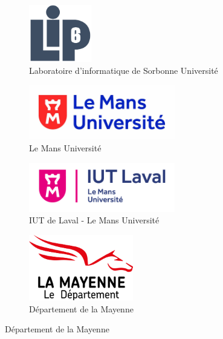 \begin{figure}[!ht]
	\begin{subfigure}{0.4\textwidth}
            \centering
		\includegraphics[width=0.3\textwidth]{Content/figures/logo_LIP6.png}
		\caption{Laboratoire d'informatique de Sorbonne Université}
	\end{subfigure}
	\hfill
	\begin{subfigure}{0.4\textwidth}
            \centering
		\includegraphics[width=0.7\textwidth]{Content/figures/lemans_logo.jpg}
		\caption{Le Mans Université}
	\end{subfigure}
	
	\vspace{0.08\textheight}
	
	\begin{subfigure}{0.4\textwidth}
            \centering
		\includegraphics[width=0.7\textwidth]{Content/figures/logo_iut.png}
		\caption{IUT de Laval - Le Mans Université}
	\end{subfigure}
	\hfill
	\begin{subfigure}{0.4\textwidth}
            \centering
		\includegraphics[width=0.5\textwidth]{Content/figures/mayenne_logo.png}
		\caption{Département de la Mayenne}
	\end{subfigure}
\end{figure}

\pageblanche %
